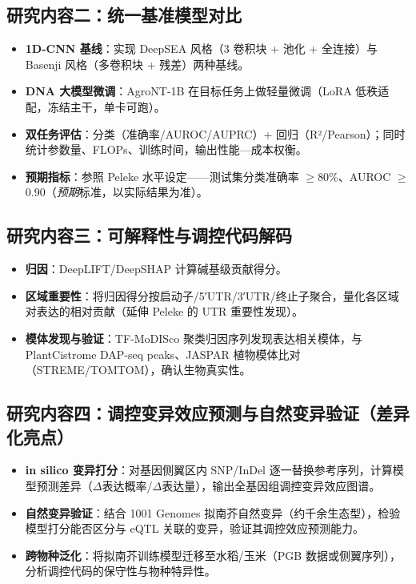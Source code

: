 \documentclass[UTF8,11pt,a4paper]{ctexart}
\begin{document}
\subsection{研究内容二：统一基准模型对比}
\label{sec:obj-model}

\begin{itemize}
\item \textbf{1D-CNN 基线}：实现 DeepSEA 风格（3 卷积块 + 池化 + 全连接）与 Basenji 风格（多卷积块 + 残差）两种基线\cite{zhou2015,avsec2021}。
\item \textbf{DNA 大模型微调}：AgroNT-1B 在目标任务上做轻量微调（LoRA 低秩适配，冻结主干，单卡可跑）\cite{mendoza2024}。
\item \textbf{双任务评估}：分类（准确率/AUROC/AUPRC）+ 回归（R²/Pearson）；同时统计参数量、FLOPs、训练时间，输出性能—成本权衡。
\item \textbf{预期指标}：参照 Peleke 水平设定——测试集分类准确率 $\geq$80\%、AUROC $\geq$0.90（\emph{预期}标准，以实际结果为准）\cite{peleke2024}。
\end{itemize}

\subsection{研究内容三：可解释性与调控代码解码}
\label{sec:obj-interp}

\begin{itemize}
\item \textbf{归因}：DeepLIFT/DeepSHAP 计算碱基级贡献得分\cite{shrikumar2017}。
\item \textbf{区域重要性}：将归因得分按启动子/5′UTR/3′UTR/终止子聚合，量化各区域对表达的相对贡献（延伸 Peleke 的 UTR 重要性发现）\cite{peleke2024}。
\item \textbf{模体发现与验证}：TF-MoDISco 聚类归因序列发现表达相关模体，与 PlantCistrome DAP-seq peaks、JASPAR 植物模体比对（STREME/TOMTOM），确认生物真实性\cite{omalley2016}。
\end{itemize}

\subsection{研究内容四：调控变异效应预测与自然变异验证（差异化亮点）}
\label{sec:obj-variant}

\begin{itemize}
\item \textbf{in silico 变异打分}：对基因侧翼区内 SNP/InDel 逐一替换参考序列，计算模型预测差异（$\Delta$表达概率/$\Delta$表达量），输出全基因组调控变异效应图谱。
\item \textbf{自然变异验证}：结合 1001 Genomes 拟南芥自然变异（约千余生态型），检验模型打分能否区分与 eQTL 关联的变异，验证其调控效应预测能力。
\item \textbf{跨物种泛化}：将拟南芥训练模型迁移至水稻/玉米（PGB 数据或侧翼序列），分析调控代码的保守性与物种特异性。
\end{itemize}
\end{document}
